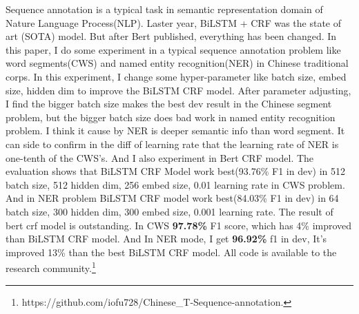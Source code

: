 Sequence annotation is a typical task in semantic representation domain of Nature Language Process(NLP).
Laster year, BiLSTM + CRF was the state of art (SOTA) model.
But after Bert published, everything has been changed.
In this paper, I do some experiment in a typical sequence annotation problem like word segments(CWS) and named entity recognition(NER) in Chinese traditional corps.
In this experiment, I change some hyper-parameter like batch size, embed size, hidden dim to improve the BiLSTM CRF model.
After parameter adjusting, I find the bigger batch size makes the best dev result in the Chinese segment problem, but the bigger batch size does bad work in named entity recognition problem.
I think it cause by NER is deeper semantic info than word segment.
It can side to confirm in the diff of learning rate that the learning rate of NER is one-tenth of the CWS's.
And I also experiment in Bert CRF model.
The evaluation shows that BiLSTM CRF Model work best(93.76\% F1 in dev) in 512 batch size, 512 hidden dim, 256 embed size, 0.01 learning rate in CWS problem.
And in NER problem BiLSTM CRF model work best(84.03\% F1 in dev) in 64 batch size, 300 hidden dim, 300 embed size, 0.001 learning rate. The result of bert crf model is outstanding.
In CWS \textbf{97.78\%} F1 score, which has 4\% improved than BiLSTM CRF model.
And In NER mode, I get  \textbf{96.92\%} f1 in dev, It's improved 13\% than the best BiLSTM CRF model.
All code is available to the research community.\footnote{https://github.com/iofu728/Chinese\_T-Sequence-annotation.}
